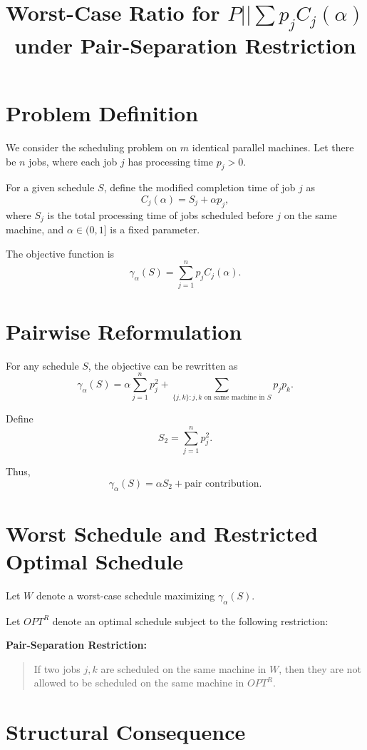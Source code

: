 \documentclass[11pt]{article}
\title{Worst-Case Ratio for $P||\sum p_j C_j(\alpha)$ under Pair-Separation Restriction}
\author{}
\date{}
\begin{document}
\maketitle

\section{Problem Definition}

We consider the scheduling problem on $m$ identical parallel machines. Let there be $n$ jobs, where each job $j$ has processing time $p_j > 0$.

For a given schedule $S$, define the modified completion time of job $j$ as
\[
C_j(\alpha) = S_j + \alpha p_j,
\]
where $S_j$ is the total processing time of jobs scheduled before $j$ on the same machine, and $\alpha \in (0,1]$ is a fixed parameter.

The objective function is
\[
\gamma_{\alpha}(S) = \sum_{j=1}^n p_j C_j(\alpha).
\]

\section{Pairwise Reformulation}

For any schedule $S$, the objective can be rewritten as
\[
\gamma_{\alpha}(S)
=
\alpha \sum_{j=1}^n p_j^2
+
\sum_{\{j,k\}: j,k \text{ on same machine in } S} p_j p_k.
\]

Define
\[
S_2 = \sum_{j=1}^n p_j^2.
\]

Thus,
\[
\gamma_{\alpha}(S) = \alpha S_2 + \text{pair contribution}.
\]

\section{Worst Schedule and Restricted Optimal Schedule}

Let $W$ denote a worst-case schedule maximizing $\gamma_{\alpha}(S)$.

Let $OPT^R$ denote an optimal schedule subject to the following restriction:

\medskip

\noindent
\textbf{Pair-Separation Restriction:}
\begin{quote}
If two jobs $j,k$ are scheduled on the same machine in $W$, then they are not allowed to be scheduled on the same machine in $OPT^R$.
\end{quote}

\medskip

\section{Structural Consequence}
\end{document}
